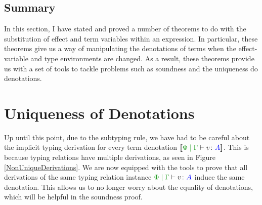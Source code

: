 \documentclass{Report}
\begin{document}
\subsection{Summary}
In this section, I have stated and proved a number of theorems to do with the substitution of effect and term variables within an expression. In particular, these theorems give us a way of manipulating the denotations of terms when the effect-variable and type environments are changed. As a result, these theorems provide us with a set of tools to tackle problems such as soundness and the uniqueness do denotations.

\section{Uniqueness of Denotations}\label{UniqueDenotations}

Up until this point, due to the subtyping rule, we have had to be careful about the implicit typing derivation for every term denotation $\deno{\gpetyperelation{v}{A}}$. This is because typing relations have multiple derivations, as seen in Figure \ref{NonUniqueDerivations}. We are now equipped with the tools to prove that all derivations of the same typing relation instance $\gpetyperelation{v}{A}$ induce the same denotation. This allows us to no longer worry about the equality of denotations, which will be helpful in the soundness proof.
\end{document}
